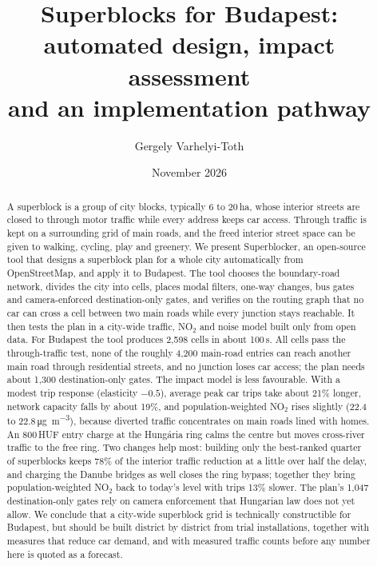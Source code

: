\documentclass[11pt,a4paper]{article}
\title{Superblocks for Budapest:\\automated design, impact assessment\\and an implementation pathway}
\author{Gergely Varhelyi-Toth}
\date{November 2026}
\begin{document}
\maketitle

\begin{abstract}
\noindent A superblock is a group of city blocks, typically 6 to 20\,ha, whose interior streets are closed to through motor traffic while every address keeps car access. Through traffic is kept on a surrounding grid of main roads, and the freed interior street space can be given to walking, cycling, play and greenery.
We present Superblocker, an open-source tool that designs a superblock plan for a whole city automatically from OpenStreetMap, and apply it to Budapest. The tool chooses the boundary-road network, divides the city into cells, places modal filters, one-way changes, bus gates and camera-enforced destination-only gates, and verifies on the routing graph that no car can cross a cell between two main roads while every junction stays reachable. It then tests the plan in a city-wide traffic, NO$_2$ and noise model built only from open data.
For Budapest the tool produces 2,598 cells in about 100\,s. All cells pass the through-traffic test, none of the roughly 4,200 main-road entries can reach another main road through residential streets, and no junction loses car access; the plan needs about 1,300 destination-only gates.
The impact model is less favourable. With a modest trip response (elasticity $-0.5$), average peak car trips take about 21\% longer, network capacity falls by about 19\%, and population-weighted NO$_2$ rises slightly (22.4 to 22.8\,\si{\micro\gram\per\cubic\metre}), because diverted traffic concentrates on main roads lined with homes. An 800\,HUF entry charge at the Hungária ring calms the centre but moves cross-river traffic to the free ring. Two changes help most: building only the best-ranked quarter of superblocks keeps 78\% of the interior traffic reduction at a little over half the delay, and charging the Danube bridges as well closes the ring bypass; together they bring population-weighted NO$_2$ back to today's level with trips 13\% slower. The plan's 1,047 destination-only gates rely on camera enforcement that Hungarian law does not yet allow.
We conclude that a city-wide superblock grid is technically constructible for Budapest, but should be built district by district from trial installations, together with measures that reduce car demand, and with measured traffic counts before any number here is quoted as a forecast.
\end{abstract}
\end{document}
